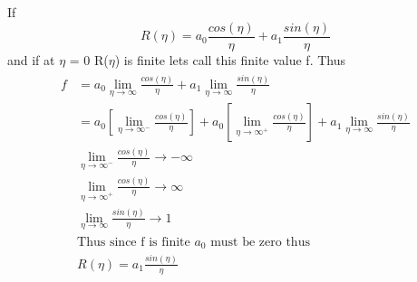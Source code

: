 \documentclass[10pt]{article}
\numberwithin{equation}{section}
\begin{document}
		\section{}
		If
		\begin{equation*}
			R(\eta) = a_0\frac{cos(\eta)}{\eta} + a_1\frac{sin(\eta)}{\eta}
		\end{equation*}
		and if at \(\eta\) = 0 R(\(\eta\)) is finite lets call this finite value f.
		Thus
		\begin{align}\label{finalEtaR}
			\begin{split}
				f &=a_0\lim_{\eta\to\infty}\frac{cos(\eta)}{\eta} + a_1\lim_{\eta\to\infty}\frac{sin(\eta)}{\eta}\\
				&=a_0\left[\lim_{\eta\to\infty^-}\frac{cos(\eta)}{\eta}\right] +a_0\left[\lim_{\eta\to\infty^+}\frac{cos(\eta)}{\eta}\right] + a_1\lim_{\eta\to\infty}\frac{sin(\eta)}{\eta}\\
				&\lim_{\eta\to\infty^-}\frac{cos(\eta)}{\eta}\to-\infty\\
				&\lim_{\eta\to\infty^+}\frac{cos(\eta)}{\eta}\to\infty\\
				&\lim_{\eta\to\infty}\frac{sin(\eta)}{\eta}\to1\\
				&\text{Thus since f is finite \(a_0\) must be zero thus}\\
				&R(\eta) = a_1\frac{sin(\eta)}{\eta}
			\end{split}
		\end{align}
		\\
\end{document}
